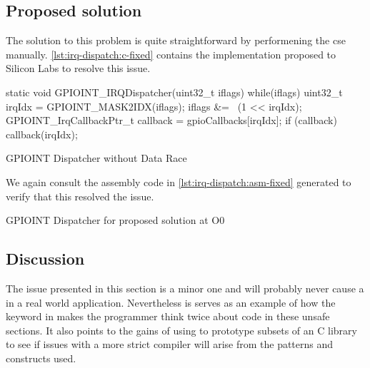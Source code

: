 \subsection{Proposed solution}

The solution to this problem is quite straightforward by performening the \gls{cse} manually.
\autoref{lst:irq-dispatch:c-fixed} contains the implementation proposed to Silicon Labs to resolve this issue.

\begin{listing}[H]
  \begin{rustcode}
static void GPIOINT_IRQDispatcher(uint32_t iflags) {
  while(iflags) {
    uint32_t irqIdx = GPIOINT_MASK2IDX(iflags);
    iflags &= ~(1 << irqIdx);
    GPIOINT_IrqCallbackPtr_t callback = gpioCallbacks[irqIdx];
    if (callback) {
      callback(irqIdx);
    }
  }
}
  \end{rustcode}
  \caption{GPIOINT Dispatcher without Data Race}
  \label{lst:irq-dispatch:c-fixed}
\end{listing}

We again consult the assembly code in \autoref{lst:irq-dispatch:asm-fixed} generated to verify that this resolved the issue.

\begin{listing}[H]
  \caption{GPIOINT Dispatcher for proposed solution at O0}
  \label{lst:irq-dispatch:asm-fixed}
\end{listing}

\subsection{Discussion}

The issue presented in this section is a minor one and will probably never cause a  in a real world application.
Nevertheless is serves as an example of how the {\unsafe} keyword in {\rust} makes the programmer think twice about code in these unsafe sections.
It also points to the gains of using {\rust} to prototype subsets of an C library to see if issues with a more strict compiler will arise from the patterns and constructs used.
